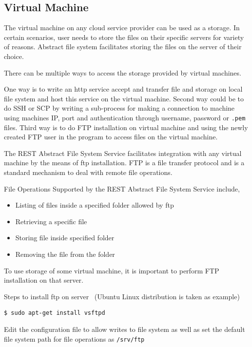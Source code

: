 \subsection{Virtual Machine}

The virtual machine on any cloud service provider can be used as a
storage. In certain scenarios, user needs to store the files on their
specific servers for variety of reasons. Abstract file system
facilitates storing the files on the server of their choice.

There can be multiple ways to access the storage provided by virtual
machines.

One way is to write an http service accept and transfer file and
storage on local file system and host this service on the virtual
machine. Second way could be to do SSH or SCP by writing a sub-process
for making a connection to machine using machines IP, port and
authentication through username, password or \verb|.pem| files. Third
way is to do FTP installation on virtual machine and using the newly
created FTP user in the program to access files on the virtual
machine.


The REST Abstract File System Service facilitates integration with any
virtual machine by the means of ftp installation. FTP is a file
transfer protocol and is a standard mechanism to deal with remote file
operations.


File Operations Supported by the REST Abstract File System Service include,
\begin{itemize}
    \item  Listing of files inside a specified folder allowed by ftp
    \item  Retrieving a specific file 
    \item  Storing file inside specified folder
    \item  Removing the file from the folder
\end{itemize}   

To use storage of some virtual machine, it is important to perform 
FTP installation on that server. 

Steps to install ftp on server~\cite{hid-sp18-420-FTP}
(Ubuntu Linux distribution is taken as example)


\begin{verbatim}
$ sudo apt-get install vsftpd
\end{verbatim}

Edit the configuration file to allow writes to file system as well as
set the default file system path for file operations as
\verb|/srv/ftp|

